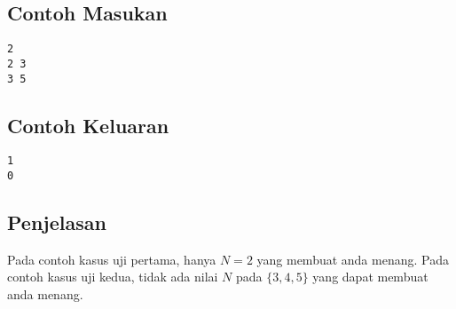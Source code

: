 \documentclass{article}
\begin{document}
\begin{multicols}{2}
\subsection*{Contoh Masukan}
\begin{lstlisting}
2
2 3
3 5
\end{lstlisting}
\columnbreak
\subsection*{Contoh Keluaran}
\begin{lstlisting}
1
0
\end{lstlisting}
\vfill
\null
\end{multicols}

\subsection*{Penjelasan}
Pada contoh kasus uji pertama, hanya $N = 2$ yang membuat anda menang.
Pada contoh kasus uji kedua, tidak ada nilai $N$ pada $\{3,4,5\}$ yang dapat membuat anda menang.
\pagebreak
\end{document}
